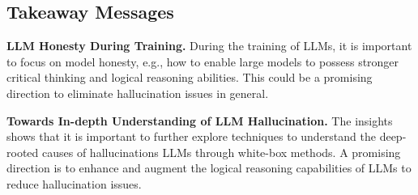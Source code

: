 
\subsection{Takeaway Messages}
\noindent\textbf{LLM Honesty During Training.} During the training of LLMs, it is important to focus on model honesty, e.g., how to enable large models to possess stronger critical thinking and logical reasoning abilities. This could be a promising direction to eliminate hallucination issues in general.

\noindent\textbf{Towards In-depth Understanding of LLM Hallucination.} 
The insights shows that 
it is important to further explore techniques to understand the deep-rooted causes of hallucinations LLMs through white-box methods. A promising direction is to enhance and augment the logical reasoning capabilities of LLMs to reduce hallucination issues.